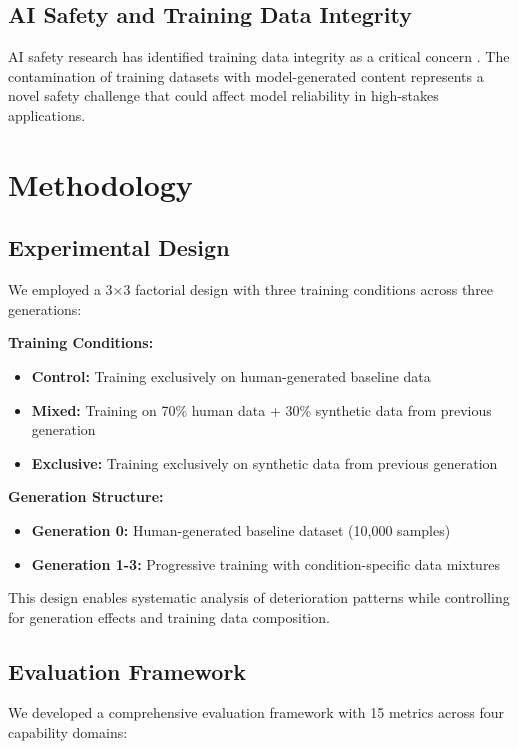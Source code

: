 \documentclass{article}
\begin{document}
\subsection{AI Safety and Training Data Integrity}

AI safety research has identified training data integrity as a critical concern \citep{amodei2016concrete,russell2019human}. The contamination of training datasets with model-generated content represents a novel safety challenge that could affect model reliability in high-stakes applications.

\section{Methodology}

\subsection{Experimental Design}

We employed a 3×3 factorial design with three training conditions across three generations:

\textbf{Training Conditions:}
\begin{itemize}
\item \textbf{Control:} Training exclusively on human-generated baseline data
\item \textbf{Mixed:} Training on 70\% human data + 30\% synthetic data from previous generation
\item \textbf{Exclusive:} Training exclusively on synthetic data from previous generation
\end{itemize}

\textbf{Generation Structure:}
\begin{itemize}
\item \textbf{Generation 0:} Human-generated baseline dataset (10,000 samples)
\item \textbf{Generation 1-3:} Progressive training with condition-specific data mixtures
\end{itemize}

This design enables systematic analysis of deterioration patterns while controlling for generation effects and training data composition.

\subsection{Evaluation Framework}

We developed a comprehensive evaluation framework with 15 metrics across four capability domains:
\end{document}
